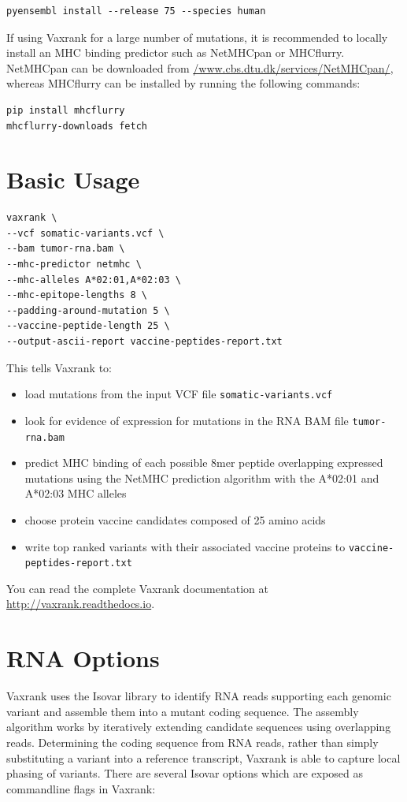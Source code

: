 \documentclass[10pt,letterpaper]{article}
\begin{document}
\begin{verbatim}
pyensembl install --release 75 --species human
\end{verbatim}

If using Vaxrank for a large number of mutations, it is recommended to locally install an MHC binding predictor such as NetMHCpan or MHCflurry. NetMHCpan can be downloaded from \href{http://www.cbs.dtu.dk/services/NetMHCpan/}{/www.cbs.dtu.dk/services/NetMHCpan/}, whereas MHCflurry can be installed by running the following commands:

\begin{verbatim}
pip install mhcflurry
mhcflurry-downloads fetch
\end{verbatim}

\section*{Basic Usage}

\begin{verbatim}
vaxrank \
--vcf somatic-variants.vcf \
--bam tumor-rna.bam \
--mhc-predictor netmhc \
--mhc-alleles A*02:01,A*02:03 \
--mhc-epitope-lengths 8 \
--padding-around-mutation 5 \
--vaccine-peptide-length 25 \
--output-ascii-report vaccine-peptides-report.txt
\end{verbatim}

This tells Vaxrank to:
\begin{itemize}
    \item load mutations from the input VCF file \verb|somatic-variants.vcf|
    \item look for evidence of expression for mutations in the RNA BAM file \verb|tumor-rna.bam|
    \item predict MHC binding of each possible 8mer peptide overlapping expressed mutations  using the NetMHC prediction algorithm with the A*02:01 and A*02:03 MHC alleles
    \item choose protein vaccine candidates composed of 25 amino acids
    \item write top ranked variants with their associated vaccine proteins to \verb|vaccine-peptides-report.txt|
\end{itemize}

You can read the complete Vaxrank documentation at \href{http://vaxrank.readthedocs.io}{http://vaxrank.readthedocs.io}.

\section*{RNA Options}
Vaxrank uses the Isovar library to identify RNA reads supporting each genomic variant and assemble them into a mutant coding sequence. The assembly algorithm works by iteratively extending candidate sequences using overlapping reads. Determining the coding sequence from RNA reads, rather than simply substituting a variant into a reference transcript, Vaxrank is able to capture local phasing of variants. There are several Isovar options which are exposed as commandline flags in Vaxrank:
\end{document}
